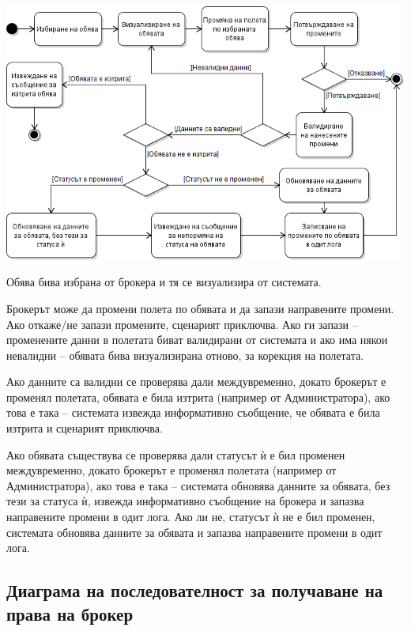 \documentclass[a4paper]{article}
\begin{document}
\begin{center}
\includegraphics[scale=0.6,keepaspectratio=true]{uml3}
\end{center}

Обява бива избрана от брокера и тя се визуализира от системата. 

Брокерът може да промени полета по обявата и да запази направените промени. Ако откаже/не запази промените, сценарият приключва. Ако ги запази -- променените данни в полетата биват валидирани от системата и ако има някои невалидни -- обявата бива визуализирана отново, за корекция на полетата. 

Ако данните са валидни се проверява дали междувременно, докато брокерът е променял полетата, обявата е била изтрита (например от Администратора), ако това е така -- системата извежда информативно съобщение, че обявата е била изтрита и сценарият приключва.

Ако обявата съществува се проверява дали статусът ѝ е бил променен междувременно, докато брокерът е променял полетата (например от Администратора), ако това е така -- системата обновява данните за обявата, без тези за статуса ѝ, извежда информативно съобщение на брокера и запазва направените промени в одит лога. Ако ли не, статусът ѝ не е бил променен, системата обновява данните за обявата и запазва направените промени в одит лога.

\clearpage
\subsection{Диаграма на последователност за получаване на права на брокер} %
\end{document}
